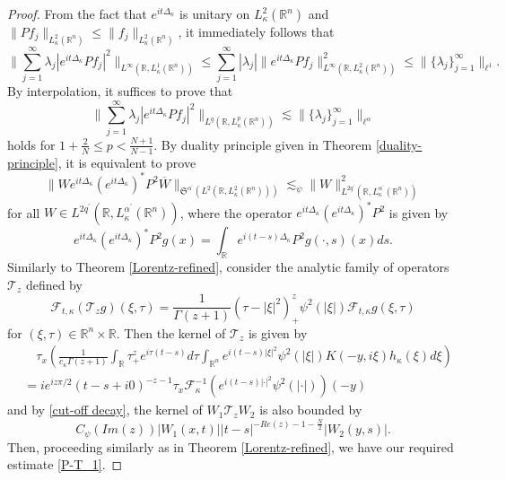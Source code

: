 \documentclass[10pt,a4paper]{amsart}
\begin{document}
\begin{proof}
    From the fact that $e^{it\Delta_\kappa}$ is unitary on $L_\kappa^2(\mathbb{R}^n)$ and $\|Pf_j\|_{L_\kappa^2(\mathbb{R}^n)}\leq \|f_j\|_{L_\kappa^2(\mathbb{R}^n)}$, it immediately follows that
    \begin{equation*}
			\bigg\|\sum_{j=1}^\infty \lambda_j|e^{it\Delta_\kappa}Pf_j|^2\bigg\|_{L^\infty(\mathbb{R}, L_\kappa^1(\mathbb{R}^n))}\leq \sum_{j=1}^\infty |\lambda_j|\|e^{it\Delta_\kappa}Pf_j\|^2_{L^\infty(\mathbb{R}, L_\kappa^2(\mathbb{R}^n))}\leq \|\{\lambda_j\}^\infty_{j=1}\|_{\ell^1}. 
\end{equation*}	
By interpolation, it suffices to prove that 
\begin{equation*}
			\bigg\|\sum_{j=1}^\infty \lambda_j|e^{it\Delta_\kappa}Pf_j|^2\bigg\|_{L^q(\mathbb{R}, L_\kappa^p(\mathbb{R}^n))}\lesssim \|\{\lambda_j\}^\infty_{j=1}\|_{\ell^{\alpha}} 
\end{equation*}	
holds for $1+\frac{2}{N}\leq p<\frac{N+1}{N-1}$. By duality principle  given in Theorem \ref{duality-principle}, it is equivalent to  prove
\begin{equation}\label{P-T_1}
	\big\|We^{it\Delta_\kappa}(e^{it\Delta_\kappa})^*P^2\overline{W}\big\|_{\mathfrak{S}^{\alpha^\prime}(L^2(\mathbb{R}, L_\kappa^2(\mathbb{R}^n)))}\lesssim_\psi\big\|W\big\|^2_{L^{2q^\prime}(\mathbb{R}, L_\kappa^{\alpha^\prime}(\mathbb{R}^n))}
		\end{equation}
  for all $W\in L^{2q^\prime}(\mathbb{R}, L_\kappa^{\alpha^\prime}(\mathbb{R}^n))$, where the operator $e^{it\Delta_\kappa}(e^{it\Delta_\kappa})^*P^2$ is given by
  \begin{equation*}
      e^{it\Delta_\kappa}(e^{it\Delta_\kappa})^*P^2g(x)=\int_\mathbb{R} e^{i(t-s)\Delta_\kappa} P^2g(\cdot,s)(x)ds.
  \end{equation*}
 Similarly to Theorem \ref{Lorentz-refined},  consider the analytic family of operators $\mathcal{T}_z$ defined by
\begin{equation*}
    \mathcal{F}_{t,\kappa}(\mathcal{T}_zg)(\xi,\tau)=\frac{1}{\Gamma(z+1)}(\tau-|\xi|^2)_+^z\psi^2(|\xi|)\mathcal{F}_{t,\kappa}g(\xi,\tau)
\end{equation*}
for $(\xi,\tau)\in\mathbb{R}^n\times\mathbb{R}$. Then the kernel of $\mathcal{T}_z$ is given by
\begin{align*}
    &\quad \tau_x\left(\frac{1}{c_\kappa\Gamma(z+1)}\int_{\mathbb{R}}\tau_+^ze^{i\tau (t-s)}d\tau\int_{\mathbb{R}^n} e^{i(t-s)|\xi|^2} \psi^2(|\xi|)K(-y,i \xi)h_\kappa(\xi)d\xi\right)\\
    &=ie^{iz \pi/2}(t-s+i0)^{-z-1}\tau_x\mathcal{F}^{-1}_\kappa \left(e^{i(t-s)|\cdot|^2} \psi^2(|\cdot|)\right)(-y)
\end{align*}
and by \eqref{cut-off decay}, the kernel of $W_1\mathcal{T}_z W_2$ is also bounded by
$$C_\psi(Im(z))|W_1(x,t)||t-s|^{-Re(z)-1-\frac{N}{2}}|W_2(y,s)|.$$
Then, proceeding similarly as in  Theorem \ref{Lorentz-refined}, we have our required estimate \eqref{P-T_1}. 
\end{proof}
\end{document}
